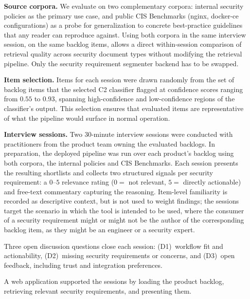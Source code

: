 \textbf{Source corpora.}
We evaluate on two complementary corpora: internal security policies as the primary use case, and public CIS Benchmarks (nginx, docker-ce configurations) as a probe for generalization to concrete best-practice guidelines that any reader can reproduce against.
Using both corpora in the same interview session, on the same backlog items, allows a direct within-session comparison of retrieval quality across security document types without modifying the retrieval pipeline.
Only the security requirement segmenter backend has to be swapped.

\textbf{Item selection.}
Items for each session were drawn randomly from the set of backlog items that the selected C2 classifier flagged at confidence scores ranging from $0.55$ to $0.93$, spanning high-confidence and low-confidence regions of the classifier's output.
This selection ensures that evaluated items are representative of what the pipeline would surface in normal operation.

\textbf{Interview sessions.}
Two $30$-minute interview sessions were conducted with practitioners from the product team owning the evaluated backlogs.
In preparation, the deployed pipeline was run over each product's backlog using both corpora, the internal policies and CIS Benchmarks.
Each session presents the resulting shortlists and collects two structured signals per security requirement: a $0$--$5$ relevance rating ($0 =$ not relevant, $5 =$ directly actionable) and free-text commentary capturing the reasoning.
Item-level familiarity is recorded as descriptive context, but is not used to weight findings; the sessions target the scenario in which the tool is intended to be used, where the consumer of a security requirement might or might not be the author of the corresponding backlog item, as they might be an engineer or a security expert.

Three open discussion questions close each session: (D1)~workflow fit and actionability, (D2)~missing security requirements or concerns, and (D3)~open feedback, including trust and integration preferences.

A web application supported the sessions by loading the product backlog, retrieving relevant security requirements, and presenting them.
